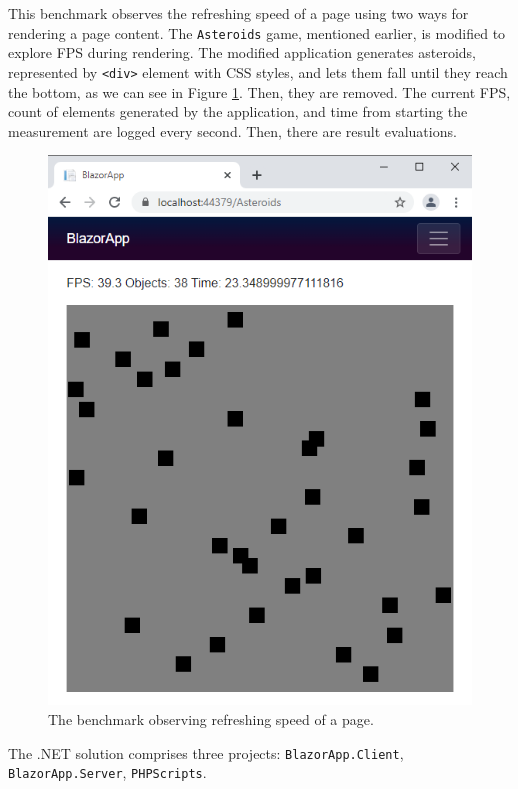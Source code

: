 This benchmark observes the refreshing speed of a page using two ways for rendering a page content.
The \texttt{Asteroids} game, mentioned earlier, is modified to explore FPS during rendering.
The modified application generates asteroids, represented by \texttt{<div>} element with CSS styles, and lets them fall until they reach the bottom, as we can see in Figure \ref{img33:benchmark}.
Then, they are removed.
The current FPS, count of elements generated by the application, and time from starting the measurement are logged every second.
Then, there are result evaluations.
\par
\begin{figure}[t]\centering
\includegraphics[scale=0.7]{./img/BenchmarkRendering}
\caption{The benchmark observing refreshing speed of a page.}
\label{img33:benchmark}
\end{figure} 
\par
The .NET solution comprises three projects: \texttt{BlazorApp.Client}, \texttt{Blazor\-App.Server}, \texttt{PHPScripts}.
